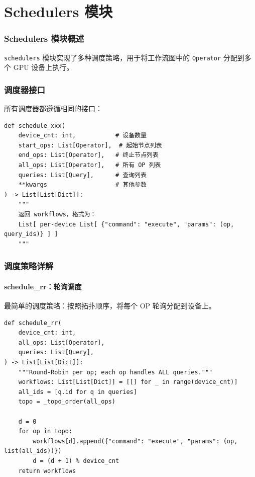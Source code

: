 \documentclass[12pt,a4paper]{article}
\begin{document}
\part{Schedulers 模块}

\section{Schedulers 模块概述}

\texttt{schedulers} 模块实现了多种调度策略，用于将工作流图中的 \texttt{Operator} 分配到多个 GPU 设备上执行。

\section{调度器接口}

所有调度器都遵循相同的接口：

\begin{lstlisting}
def schedule_xxx(
    device_cnt: int,           # 设备数量
    start_ops: List[Operator],  # 起始节点列表
    end_ops: List[Operator],   # 终止节点列表
    all_ops: List[Operator],   # 所有 OP 列表
    queries: List[Query],      # 查询列表
    **kwargs                   # 其他参数
) -> List[List[Dict]]:
    """
    返回 workflows，格式为：
    List[ per-device List[ {"command": "execute", "params": (op, query_ids)} ] ]
    """
\end{lstlisting}

\section{调度策略详解}

\subsection{schedule\_rr：轮询调度}

最简单的调度策略：按照拓扑顺序，将每个 OP 轮询分配到设备上。

\begin{lstlisting}
def schedule_rr(
    device_cnt: int,
    all_ops: List[Operator],
    queries: List[Query],
) -> List[List[Dict]]:
    """Round-Robin per op; each op handles ALL queries."""
    workflows: List[List[Dict]] = [[] for _ in range(device_cnt)]
    all_ids = [q.id for q in queries]
    topo = _topo_order(all_ops)
    
    d = 0
    for op in topo:
        workflows[d].append({"command": "execute", "params": (op, list(all_ids))})
        d = (d + 1) % device_cnt
    return workflows
\end{lstlisting}
\end{document}
